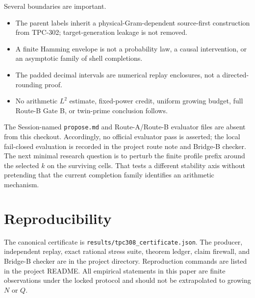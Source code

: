 \documentclass[11pt]{article}
\begin{document}
Several boundaries are important.

\begin{itemize}
\item The parent labels inherit a physical-Gram-dependent source-first
      construction from TPC-302; target-generation leakage is not removed.
\item A finite Hamming envelope is not a probability law, a causal
      intervention, or an asymptotic family of shell completions.
\item The padded decimal intervals are numerical replay enclosures, not a
      directed-rounding proof.
\item No arithmetic $L^2$ estimate, fixed-power credit, uniform growing
      budget, full Route-B Gate B, or twin-prime conclusion follows.
\end{itemize}

The Session-named \texttt{propose.md} and Route-A/Route-B evaluator files
are absent from this checkout.  Accordingly, no official evaluator pass is
asserted; the local fail-closed evaluation is recorded in the project route
note and Bridge-B checker.  The next minimal research question is to perturb
the finite profile prefix around the selected $k$ on the surviving cells.
That tests a different stability axis without pretending that the current
completion family identifies an arithmetic mechanism.

\section*{Reproducibility}

The canonical certificate is
\texttt{results/tpc308\_certificate.json}.  The producer, independent replay,
exact rational stress suite, theorem ledger, claim firewall, and Bridge-B
checker are in the project directory.  Reproduction commands are listed in
the project README.  All empirical statements in this paper are finite
observations under the locked protocol and should not be extrapolated to
growing $N$ or $Q$.



\end{document}

